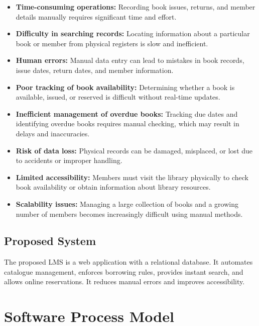 \documentclass[11pt,a4paper]{article}
\begin{document}
\begin{itemize}[leftmargin=*]
\item \textbf{Time-consuming operations:} Recording book issues, returns, and member details manually requires significant time and effort.

\item \textbf{Difficulty in searching records:} Locating information about a particular book or member from physical registers is slow and inefficient.

\item \textbf{Human errors:} Manual data entry can lead to mistakes in book records, issue dates, return dates, and member information.

\item \textbf{Poor tracking of book availability:} Determining whether a book is available, issued, or reserved is difficult without real-time updates.

\item \textbf{Inefficient management of overdue books:} Tracking due dates and identifying overdue books requires manual checking, which may result in delays and inaccuracies.

\item \textbf{Risk of data loss:} Physical records can be damaged, misplaced, or lost due to accidents or improper handling.

\item \textbf{Limited accessibility:} Members must visit the library physically to check book availability or obtain information about library resources.

\item \textbf{Scalability issues:} Managing a large collection of books and a growing number of members becomes increasingly difficult using manual methods.

\end{itemize}

\subsection{Proposed System}
The proposed LMS is a web application with a relational database. It automates catalogue management, enforces borrowing rules, provides instant search, and allows online reservations. It reduces manual errors and improves accessibility.


\section{Software Process Model}
\end{document}
